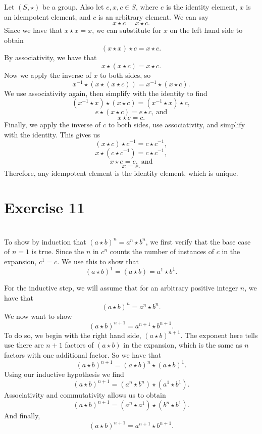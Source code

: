 \documentclass[12pt]{article}
\begin{document}
Let $(S,\star)$ be a group. Also let $e,x,c \in S$, where $e$ is the identity element, $x$ is an idempotent element, and $c$ is an arbitrary element. We can say
\[x \star c = x \star c.\]
Since we have that $x\star x=x$, we can substitute for $x$ on the left hand side to obtain
\[(x \star x)\star c = x \star c.\]
By associativity, we have that
\[x \star (x\star c) = x \star c.\]
Now we apply the inverse of $x$ to both sides, so
\[x^{-1} \star (x \star (x\star c)) = x^{-1} \star (x \star c).\]
We use associativity again, then simplify with the identity to find
\[(x^{-1} \star x) \star (x\star c) = (x^{-1} \star x) \star c,\]
\[e \star (x\star c) = e \star c \text{, and}\]
\[x\star c = c.\]
Finally, we apply the inverse of $c$ to both sides, use associativity, and simplify with the identity. This gives us
\[(x\star c) \star c^{-1} = c\star c^{-1},\]
\[x\star (c \star c^{-1}) = c\star c^{-1},\]
\[x\star e = e, \text{ and}\]
\[x = e.\]
Therefore, any idempotent element is the identity element, which is unique.

\newpage
\section*{Exercise 11}
\\

To show by induction that $(a \star b)^n = a^n \star b^n$, we first verify that the base case of $n=1$ is true. Since the $n$ in $c^n$ counts the number of instances of $c$ in the expansion, $c^1 = c$. We use this to show that
\[(a\star b)^1 = (a\star b) =a^1 \star b^1.\]

For the inductive step, we will assume that for an arbitrary positive integer $n$, we have that
\[(a \star b)^n = a^n \star b^n.\]
We now want to show
\[(a \star b)^{n+1} = a^{n+1} \star b^{n+1}.\]
To do so, we begin with the right hand side, $(a \star b)^{n+1}$. The exponent here tells use there are $n+1$ factors of $(a \star b)$ in the expansion, which is the same as $n$ factors with one additional factor. So we have that
\[(a \star b)^{n+1} = (a \star b)^n \star (a \star b)^1.\]
Using our inductive hypothesis we find
\[(a \star b)^{n+1} = (a^n \star b^n) \star (a^1 \star b^1).\]
Associativity and commutativity allows us to obtain
\[(a \star b)^{n+1} = (a^n \star a^1) \star (b^n \star b^1).\]
And finally,
\[(a \star b)^{n+1} = a^{n+1} \star b^{n+1}.\]
\end{document}
